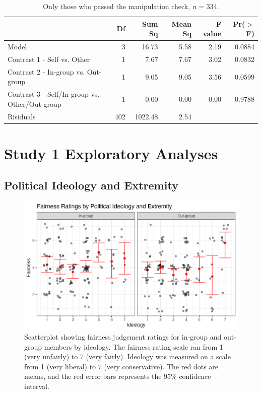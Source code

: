 \documentclass[12pt,]{article}
\begin{document}
\vspace{0.6cm}

\begin{table}[ht]
\centering
\begin{tabular}{lrrrrr}
  \hline
 & Df & Sum Sq & Mean Sq & F value & Pr($>$F) \\ 
  \hline
Model & 3 & 16.73 & 5.58 & 2.19 & 0.0884 \\ 
  Contrast 1 - Self vs. Other & 1 & 7.67 & 7.67 & 3.02 & 0.0832 \\ 
  Contrast 2 - In-group vs. Out-group & 1 & 9.05 & 9.05 & 3.56 & 0.0599 \\ 
  Contrast 3 - Self/In-group vs. Other/Out-group & 1 & 0.00 & 0.00 & 0.00 & 0.9788 \\ 
  Risiduals & 402 & 1022.48 & 2.54 &  &  \\ 
   \hline
\end{tabular}
\caption{Only those who passed the manipulation check, \emph{n} = 334.} 
\label{manip}
\end{table}



\clearpage
\section{Study 1 Exploratory Analyses}
\label{appendix:study1_robust}


\subsection{Political Ideology and Extremity}
\label{appendix:ideo_extrem1}

\begin{figure}
	\centering
	\includegraphics{Plots/Study1_ideology_extremity.png}
	\caption{Scatterplot showing fairness judgement ratings for in-group and out-group members by ideology. The fairness rating scale ran from 1 (very unfairly) to 7 (very fairly). Ideology was measured on a scale from 1 (very liberal) to 7 (very conservative). The red dots are means, and the red error bars represents the 95\% confidence interval.}
	\label{fig:CID_allS1}
\end{figure}
\end{document}
